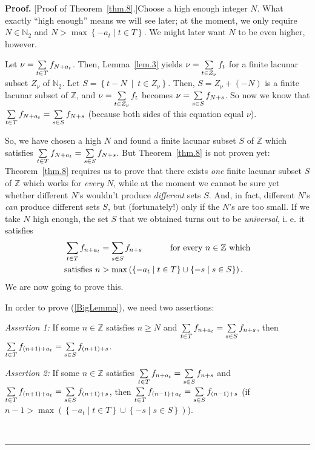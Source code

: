 \documentclass[numbers=enddot,12pt,final,onecolumn,notitlepage]{scrartcl}%
\numberwithin{exer}{section}
\theoremstyle{definition}
\newenvironment{proof}[1][Proof]{\noindent\textbf{#1.} }{\ \rule{0.5em}{0.5em}}
\let\sumnonlimits\sum
\renewcommand{\sum}{\sumnonlimits\limits}
\begin{document}
\begin{proof}
[Proof of Theorem~\ref{thm.8}.]Choose a high enough integer $N$. What exactly
``high enough'' means we will see later; at the moment, we only require
$N\in\mathbb{N}_{2}$ and $N>\max\left\{  -a_{t}\mid t\in T\right\}  $. We
might later want $N$ to be even higher, however.

Let $\nu=\sum\limits_{t\in T}f_{N+a_{t}}$. Then, Lemma~\ref{lem.3} yields
$\nu=\sum\limits_{t\in Z_{\nu}}f_{t}$ for a finite lacunar subset $Z_{\nu}$ of
$\mathbb{N}_{2}$. Let $S=\left\{  t-N\ \mid\ t\in Z_{\nu}\right\}  $. Then,
$S=Z_{\nu}+\left(  -N\right)  $ is a finite lacunar subset of $\mathbb{Z}$,
and $\nu=\sum\limits_{t\in Z_{\nu}}f_{t}$ becomes $\nu=\sum\limits_{s\in
S}f_{N+s}$. So now we know that $\sum\limits_{t\in T}f_{N+a_{t}}%
=\sum\limits_{s\in S}f_{N+s}$ (because both sides of this equation equal $\nu$).

So, we have chosen a high $N$ and found a finite lacunar subset $S$ of
$\mathbb{Z}$ which satisfies $\sum\limits_{t\in T}f_{N+a_{t}}=\sum
\limits_{s\in S}f_{N+s}$. But Theorem~\ref{thm.8} is not proven yet:
Theorem~\ref{thm.8} requires us to prove that there exists \textit{one} finite
lacunar subset $S$ of $\mathbb{Z}$ which works for \textit{every} $N$, while
at the moment we cannot be sure yet whether different $N$'s wouldn't produce
\textit{different} sets $S$. And, in fact, different $N$'s \textit{can}
produce different sets $S$, but (fortunately!) only if the $N$'s are too
small. If we take $N$ high enough, the set $S$ that we obtained turns out to
be \textit{universal}, i. e. it satisfies
\begin{align}
\sum\limits_{t\in T}f_{n+a_{t}}  &  =\sum\limits_{s\in S}f_{n+s}%
\ \ \ \ \ \ \ \ \ \ \text{for every }n\in\mathbb{Z}\text{ which}\nonumber\\
\text{satisfies }n  &  >\max\left(  \left\{  -a_{t}\mid t\in T\right\}
\cup\left\{  -s\mid s\in S\right\}  \right)  . \label{BigLemma}%
\end{align}
We are now going to prove this.

In order to prove (\ref{BigLemma}), we need two assertions:

\textit{Assertion 1:} If some $n\in\mathbb{Z}$ satisfies $n\geq N$ and
$\sum\limits_{t\in T}f_{n+a_{t}}=\sum\limits_{s\in S}f_{n+s}$, then
$\sum\limits_{t\in T}f_{\left(  n+1\right)  +a_{t}}=\sum\limits_{s\in
S}f_{\left(  n+1\right)  +s}$.

\textit{Assertion 2:} If some $n\in\mathbb{Z}$ satisfies $\sum\limits_{t\in
T}f_{n+a_{t}}=\sum\limits_{s\in S}f_{n+s}$ and $\sum\limits_{t\in T}f_{\left(
n+1\right)  +a_{t}}=\sum\limits_{s\in S}f_{\left(  n+1\right)  +s}$, then
$\sum\limits_{t\in T}f_{\left(  n-1\right)  +a_{t}}=\sum\limits_{s\in
S}f_{\left(  n-1\right)  +s}$ (if $n-1>\max\left(  \left\{  -a_{t}\mid t\in
T\right\}  \cup\left\{  -s\mid s\in S\right\}  \right)  $).


\end{proof}
\end{document}
